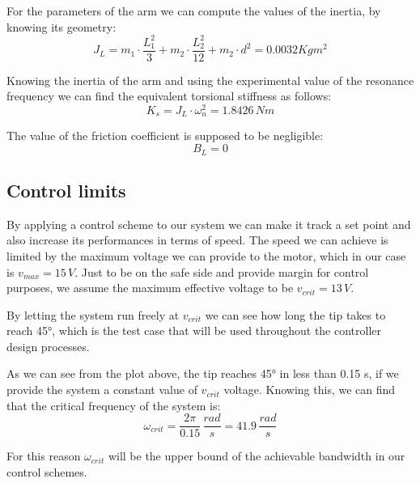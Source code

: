             For the parameters of the arm we can compute the values of the inertia, by knowing its geometry: 
                    \[J_L = m_1 \cdot \frac{L_1^2}{3} + m_2 \cdot \frac{L_2^2}{12} + m_2 \cdot d^2 = 0.0032 Kg m^2\]

            Knowing the inertia of the arm and using the experimental value of the resonance frequency we can find the equivalent torsional stiffness as follows:
            \[
                    K_s = J_L \cdot \omega_n^2 = 1.8426 \, Nm\]

            The value of the friction coefficient is supposed to be negligible:
                \[
                    B_L = 0\]

    \subsection{Control limits}  
    \label{sec: control limits}
        By applying a control scheme to our system we can make it track a set point and also increase its performances in terms of speed. The speed we can achieve is limited by the maximum voltage we can provide to the motor, which in our case is $v_{max} = 15 \, V$.
        Just to be on the safe side and provide margin for control purposes, we assume the maximum effective voltage to be $v_{crit} = 13 \, V$.

        By letting the system run freely at $v_{crit}$ we can see how long the tip takes to reach 45°, which is the test case that will be used throughout the controller design processes.


        As we can see from the plot above, the tip reaches 45° in less than 0.15 s, if we provide the system a constant value of $v_{crit}$ voltage.
        Knowing this, we can find that the critical frequency of the system is:
        \[
            \omega_{crit} = \frac{2\pi}{0.15} \, \frac{rad}{s} = 41.9 \, \frac{rad}{s} 
        \]

        For this reason $\omega_{crit}$ will be the upper bound of the achievable bandwidth in our control schemes.